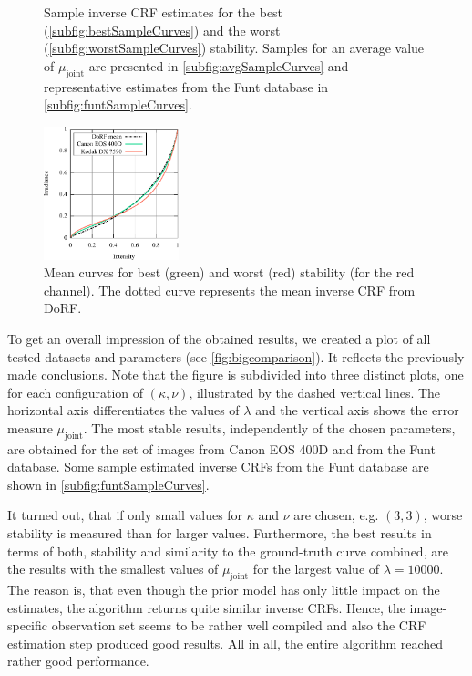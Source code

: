\begin{figure}[bt]
{  }
  \caption[Sample inverse CRF estimates (stability test)]{Sample inverse CRF estimates for the best (\autoref{subfig:bestSampleCurves}) and the worst (\autoref{subfig:worstSampleCurves}) stability. Samples for an average value of $\mu_\text{joint}$ are presented in \autoref{subfig:avgSampleCurves} and representative estimates from the Funt database in \autoref{subfig:funtSampleCurves}.}
  \label{fig:samplecurvesStability}
\end{figure}

\begin{figure}[bt]
	\centering
 	\includegraphics[width=0.35\textwidth]{plots/best_vs_worst_mean_red_channel.pdf}
	\caption[Best and worst mean curve]{Mean curves for best (green) and worst (red) stability (for the red channel). The dotted curve represents the mean inverse CRF from DoRF.}
\label{fig:meancurvesred}	
\end{figure}

To get an overall impression of the obtained results, we created a plot of all tested datasets and parameters (see \autoref{fig:bigcomparison}). It reflects the previously made conclusions. Note that the figure is subdivided into three distinct plots, one for each configuration of $(\kappa, \nu)$, illustrated by the dashed vertical lines. The horizontal axis differentiates the values of $\lambda$ and the vertical axis shows the error measure $\mu_\text{joint}$. The most stable results, independently of the chosen parameters, are obtained for the set of images from Canon EOS 400D and from the Funt database. Some sample estimated inverse CRFs from the Funt database are shown in \autoref{subfig:funtSampleCurves}. 

It turned out, that if only small values for $\kappa$ and $\nu$ are chosen, \hbox{e.g.} $(3,3)$, worse stability is measured than for larger values. Furthermore, the best results in terms of both, stability and similarity to the ground-truth curve combined, are the results with the smallest values of $\mu_\text{joint}$ for the largest value of $\lambda = 10000$. The reason is, that even though the prior model has only little impact on the estimates, the algorithm returns quite similar inverse CRFs. Hence, the image-specific observation set seems to be rather well compiled and also the CRF estimation step produced good results. All in all, the entire algorithm reached rather good performance.

